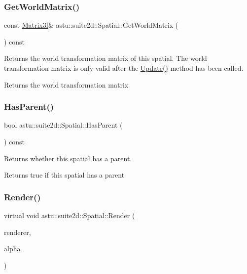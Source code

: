\subsubsection{\texorpdfstring{Get\+World\+Matrix()}{GetWorldMatrix()}}
{\footnotesize\ttfamily const \hyperlink{classastu_1_1Matrix3}{Matrix3f}\& astu\+::suite2d\+::\+Spatial\+::\+Get\+World\+Matrix (\begin{DoxyParamCaption}{ }\end{DoxyParamCaption}) const\hspace{0.3cm}{\ttfamily [inline]}}

Returns the world transformation matrix of this spatial. The world transformation matrix is only valid after the \hyperlink{classastu_1_1suite2d_1_1Spatial_aca3b41b57739b71d27f50a38517cd30b}{Update()} method has been called.

\begin{DoxyReturn}{Returns}
the world transformation matrix 
\end{DoxyReturn}
\mbox{\label{classastu_1_1suite2d_1_1Spatial_a0bc597fb32a23dab3a63b3d4cdd3567a}} 
\subsubsection{\texorpdfstring{Has\+Parent()}{HasParent()}}
{\footnotesize\ttfamily bool astu\+::suite2d\+::\+Spatial\+::\+Has\+Parent (\begin{DoxyParamCaption}{ }\end{DoxyParamCaption}) const\hspace{0.3cm}{\ttfamily [inline]}}

Returns whether this spatial has a parent.

\begin{DoxyReturn}{Returns}
{\ttfamily true} if this spatial has a parent 
\end{DoxyReturn}
\mbox{\label{classastu_1_1suite2d_1_1Spatial_afaf7797d00a432012298535ba11348b7}} 
\subsubsection{\texorpdfstring{Render()}{Render()}}
{\footnotesize\ttfamily virtual void astu\+::suite2d\+::\+Spatial\+::\+Render (\begin{DoxyParamCaption}\item[{\hyperlink{classastu_1_1suite2d_1_1SceneRenderer2D}{Scene\+Renderer2D} \&}]{renderer,  }\item[{float}]{alpha }\end{DoxyParamCaption})\hspace{0.3cm}{\ttfamily [pure virtual]}}

